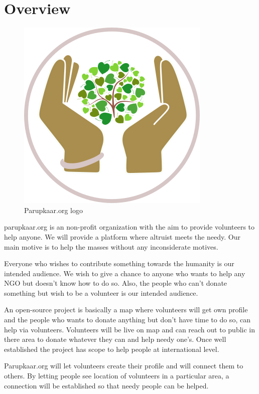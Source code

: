 \section{Overview}
\begin{figure}[H] 
	\centering \includegraphics[scale=0.31]{images/parupkaar_logo.png}
	\caption{Parupkaar.org logo}
	\label{fig:Parupkaar.orglogo}
\end{figure}
parupkaar.org is an non-profit organization with the aim to provide volunteers to help anyone.
We will provide a platform where altruist meets the needy. Our main motive is to
help the masses without any inconsiderate motives.

Everyone who wishes to contribute something towards the humanity is our intended audience. We wish to give a chance to anyone who wants to help any NGO but doesn’t know how to do so. Also, the people who can’t donate something but wish to be a volunteer is our intended audience.


An open-source project is basically a map where volunteers will get own profile and the people who wants to donate anything but don’t have time to do so, can help via volunteers. Volunteers will be live on map and can reach out to public in there area to donate whatever they can and help needy one’s. Once well established the project has scope to help people at international level.

Parupkaar.org will let volunteers create their profile and will connect them to others.
By letting people see location of volunteers in a particular area, a connection will be established so that needy people can be helped.


